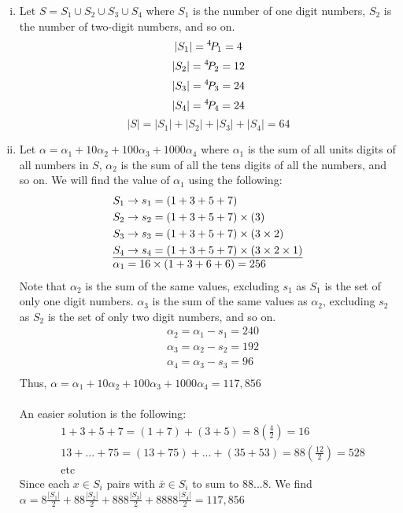 \begin{solution}
    \begin{enumerate}[(i)]
        \item Let $S = S_1 \cup S_2 \cup S_3 \cup S_4$ where $S_1$ is the number of one digit numbers, $S_2$ is the number of two-digit numbers, and so on. \\
            \[|S_1| = {}^{4}\!P_{1} = 4\]
            \[|S_2| = {}^{4}\!P_{2} = 12\]
            \[|S_3| = {}^{4}\!P_{3} = 24\]
            \[|S_4| = {}^{4}\!P_{4} = 24\]
            \[|S| = |S_1| + |S_2| + |S_3| + |S_4| = \boxed{64}\]
        \item Let $\alpha = \alpha_1 + 10\alpha_2 + 100\alpha_3 + 1000\alpha_4$ where $\alpha_1$ is the sum of all units digits of all numbers in $S$, $\alpha_2$ is the sum of all the tens digits of all the numbers, and so on. We will find the value of $\alpha_1$ using the following: 
        \begin{align*}
            &S_1 \rightarrow s_1 = (1+3+5+7)\\
            &S_2 \rightarrow s_2 = (1+3+5+7)\times (3)\\
            &S_3 \rightarrow s_3 = (1+3+5+7)\times (3\times2)\\
            &S_4 \rightarrow s_4 = (1+3+5+7)\times (3\times2\times1)\\
            \hline
            &\alpha_1 = 16 \times (1+3+6+6) = 256
        \end{align*}
        Note that $\alpha_2$ is the sum of the same values, excluding $s_1$ as $S_1$ is the set of only one digit numbers. $\alpha_3$ is the sum of the same values as $\alpha_2$, excluding $s_2$ as $S_2$ is the set of only two digit numbers, and so on.
        \begin{align*}
            &\alpha_2 = \alpha_1 - s_1 = 240\\
            &\alpha_3 = \alpha_2 - s_2 = 192\\
            &\alpha_4 = \alpha_3 - s_3 = 96\\
        \end{align*}
        Thus, $\alpha = \alpha_1 + 10\alpha_2 + 100\alpha_3 + 1000\alpha_4 = \boxed{117,856}$
        \\\\
        An easier solution is the following:
        \begin{align*}
            &1 + 3 + 5 + 7 = (1 + 7) + (3 + 5) = 8(\frac{4}{2}) = 16\\
            &13 + ... + 75 = (13 + 75) + ... + (35 + 53) = 88(\frac{12}{2}) = 528\\
            &\text{etc}
        \end{align*}
        Since each $x \in S_i$ pairs with $ \bar{x} \in S_i$ to sum to $88...8$. We find $\alpha = 8\frac{|S_1|}{2} + 88\frac{|S_2|}{2} + 888\frac{|S_3|}{2} + 8888\frac{|S_4|}{2} = \boxed{117,856}$
    \end{enumerate}
    
\end{solution}

